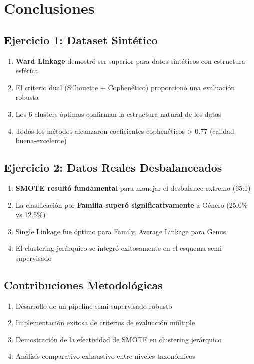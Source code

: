 \documentclass[12pt,a4paper]{article}
\begin{document}
\section{Conclusiones}

\subsection{Ejercicio 1: Dataset Sintético}
\begin{enumerate}
    \item \textbf{Ward Linkage} demostró ser superior para datos sintéticos con estructura esférica
    \item El criterio dual (Silhouette + Cophenético) proporcionó una evaluación robusta
    \item Los 6 clusters óptimos confirman la estructura natural de los datos
    \item Todos los métodos alcanzaron coeficientes cophenéticos > 0.77 (calidad buena-excelente)
\end{enumerate}

\subsection{Ejercicio 2: Datos Reales Desbalanceados}
\begin{enumerate}
    \item \textbf{SMOTE resultó fundamental} para manejar el desbalance extremo (65:1)
    \item La clasificación por \textbf{Familia superó significativamente} a Género (25.0\% vs 12.5\%)
    \item Single Linkage fue óptimo para Family, Average Linkage para Genus
    \item El clustering jerárquico se integró exitosamente en el esquema semi-supervisado
\end{enumerate}

\subsection{Contribuciones Metodológicas}
\begin{enumerate}
    \item Desarrollo de un pipeline semi-supervisado robusto
    \item Implementación exitosa de criterios de evaluación múltiple
    \item Demostración de la efectividad de SMOTE en clustering jerárquico
    \item Análisis comparativo exhaustivo entre niveles taxonómicos
\end{enumerate}
\end{document}
